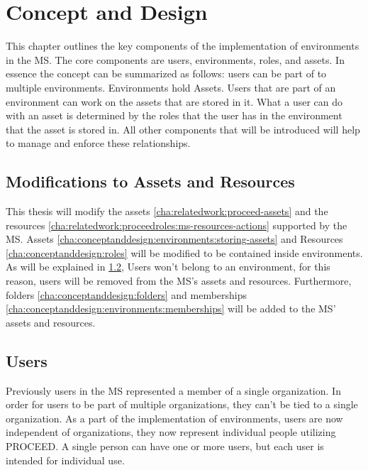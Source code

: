 \chapter{Concept and Design}
\label{cha:conceptanddesign}

This chapter outlines the key components of the implementation of environments in the MS.
The core components are users, environments, roles, and assets.
In essence the concept can be summarized as follows: users can be part of to multiple environments.
Environments hold Assets.
Users that are part of an environment can work on the assets that are stored in it.
What a user can do with an asset is determined by the roles that the user has in the
environment that the asset is stored in.
All other components that will be introduced will help to manage and enforce these relationships.

\section{Modifications to Assets and Resources}

This thesis will modify the assets \ref{cha:relatedwork:proceed-assets} and the resources
\ref{cha:relatedwork:proceedroles:ms-resources-actions} supported by the MS.
Assets \ref{cha:conceptanddesign:environments:storing-assets} and 
Resources \ref{cha:conceptanddesign:roles} will be modified to be contained inside environments.
As will be explained in \ref{cha:conceptanddesign:users}, Users won't belong to an
environment, for this reason, users will be removed from the
MS's assets and resources.
Furthermore, folders \ref{cha:conceptanddesign:folders} and  memberships
\ref{cha:conceptanddesign:environments:memberships} will be added to the MS' assets and
resources.

\section{Users}
\label{cha:conceptanddesign:users}

Previously users in the MS represented a member of a single organization.
In order for users to be part of multiple organizations, they can't be tied to a single
organization.
As a part of the implementation of environments, users are now independent of
organizations,
they now represent individual people utilizing PROCEED.
A single person can have one or more users, but each user is intended for individual use.

